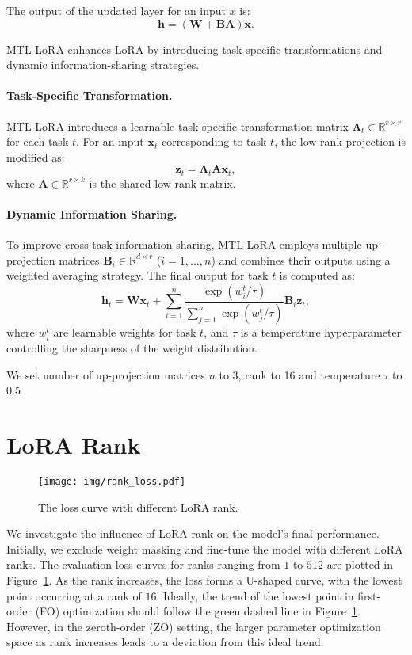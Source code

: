 The output of the updated layer for an input $x$ is:
\[
\mathbf{h} = (\mathbf{W} + \mathbf{BA})\mathbf{x}.
\]

MTL-LoRA enhances LoRA by introducing task-specific transformations and dynamic information-sharing strategies.

\paragraph{Task-Specific Transformation.} 
MTL-LoRA introduces a learnable task-specific transformation matrix $\mathbf{\Lambda}_t \in \mathbb{R}^{r \times r}$ for each task $t$. For an input $\mathbf{x}_t$ corresponding to task $t$, the low-rank projection is modified as:
\[
\mathbf{z}_t = \mathbf{\Lambda}_t \mathbf{A} \mathbf{x}_t,
\]
where $\mathbf{A} \in \mathbb{R}^{r \times k}$ is the shared low-rank matrix.

\paragraph{Dynamic Information Sharing.}
To improve cross-task information sharing, MTL-LoRA employs multiple up-projection matrices $\mathbf{B}_i \in \mathbb{R}^{d \times r}$ ($i = 1, \dots, n$) and combines their outputs using a weighted averaging strategy. The final output for task $t$ is computed as:
\[
\mathbf{h}_t = \mathbf{W} \mathbf{x}_t + \sum_{i=1}^{n} \frac{\exp(w_i^t / \tau)}{\sum_{j=1}^{n} \exp(w_j^t / \tau)} \mathbf{B}_i \mathbf{z}_t,
\]
where $w_i^t$ are learnable weights for task $t$, and $\tau$ is a temperature hyperparameter controlling the sharpness of the weight distribution.

We set number of up-projection matrices $n$ to 3, rank to 16 and temperature $\tau$ to 0.5

\section{LoRA Rank}
\label{app:lorarank}
\begin{figure}[t]
    \centering
    \texttt{[image: img/rank\_loss.pdf]} 
    \caption{The loss curve with different LoRA rank. }
    \label{fig:rankloss}
\end{figure}  
We investigate the influence of LoRA rank on the model's final performance. Initially, we exclude weight masking and fine-tune the model with different LoRA ranks. The evaluation loss curves for ranks ranging from $1$ to $512$ are plotted in Figure~\ref{fig:rankloss}. As the rank increases, the loss forms a U-shaped curve, with the lowest point occurring at a rank of $16$. Ideally, the trend of the lowest point in first-order (FO) optimization should follow the green dashed line in Figure~\ref{fig:rankloss}. However, in the zeroth-order (ZO) setting, the larger parameter optimization space as rank increases leads to a deviation from this ideal trend. 

